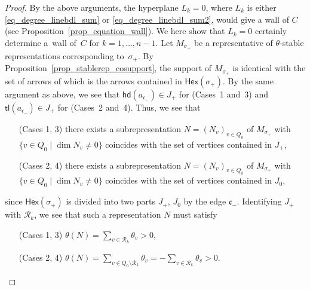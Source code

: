 \documentclass[pdftex]{sigma}
\numberwithin{equation}{section}
\theoremstyle{definition}
\newcommand{\calR}{\mathcal{R}}
\newcommand{\fkc}{\mathfrak{c}}
\newcommand{\hd}{\mathsf{hd}}
\newcommand{\tl}{\mathsf{tl}}
\newcommand{\Hex}{\mathsf{Hex}}
\begin{document}
\begin{proof}
By the above arguments, the hyperplane $L_k=0$, where $L_k$ is either \eqref{eq_degree_linebdl_sum} or \eqref{eq_degree_linebdl_sum2},
would give a wall of $C$ (see Proposition~\ref{prop_equation_wall}).
We here show that $L_k=0$ certainly determine a~wall of~$C$ for $k=1, \dots, n-1$.
Let $M_{\sigma_+}$ be a representative of $\theta$-stable representations corresponding to~$\sigma_+$.
By Proposition~\ref{prop_stablerep_cosupport}, the support of $M_{\sigma_+}$ is identical with the set of arrows of  which is the arrows contained in $\Hex(\sigma_+)$.
By the same argument as above, we see that $\hd(a_{\fkc_-})\in J_+$ for (Cases~1 and~3) and $\tl(a_{\fkc_-})\in J_+$ for (Cases~2 and~4).
Thus, we see that
\begin{itemize}\setlength{\leftskip}{1.2cm}\itemsep=0pt
\item[(Cases 1, 3)] there exists a subrepresentation $N=(N_v)_{v\in Q_0}$ of $M_{\sigma_+}$
with ${\{v\in Q_0\mid \dim N_v\neq 0\}}$ coincides with the set of vertices contained in $J_+$,
\item[(Cases 2, 4)] there exists a subrepresentation $N=(N_v)_{v\in Q_0}$ of $M_{\sigma_+}$
with $\{{v\in Q_0\mid \dim N_v\neq 0}\}$ coincides with the set of vertices contained in $J_0$,
\end{itemize}
since $\Hex(\sigma_+)$ is divided into two parts $J_+$, $J_0$ by the edge $\fkc_-$.
Identifying $J_+$ with $\calR_k$, we see that such a representation $N$ must satisfy
\begin{itemize}\setlength{\leftskip}{1.2cm}\itemsep=0pt
\item[(Cases 1, 3)] $\theta(N)=\sum_{v\in\calR_k}\theta_v>0$,
\item[(Cases 2, 4)] $\theta(N)=\sum_{v\in Q_0{\setminus}\calR_k}\theta_v=-\sum_{v\in\calR_k}\theta_v>0$.
\end{itemize}


\end{proof}
\end{document}
